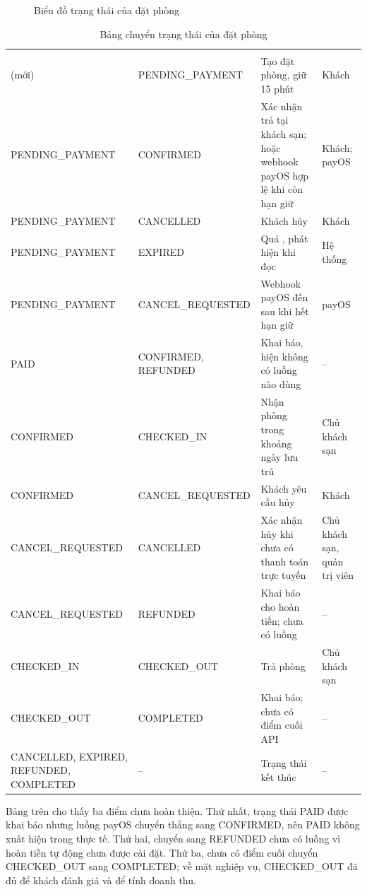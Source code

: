 \begin{figure}[H]
\centering
{}
\caption{Biểu đồ trạng thái của đặt phòng}\label{fig:state-booking}
\end{figure}

\begin{rtable}
\begin{longtable}{|L{3.4cm}|L{3.4cm}|L{4.3cm}|L{3.6cm}|}
\caption{Bảng chuyển trạng thái của đặt phòng}\label{tab:booking-states}\\
\hline
{} &  &  &  \\ \hline
\endfirsthead
\hline
{} &  &  &  \\ \hline
\endhead
(mới) & PENDING\_PAYMENT & Tạo đặt phòng, giữ 15 phút & Khách \\ \hline
PENDING\_PAYMENT & CONFIRMED & Xác nhận trả tại khách sạn; hoặc webhook payOS hợp lệ khi còn hạn giữ & Khách; payOS \\ \hline
PENDING\_PAYMENT & CANCELLED & Khách hủy & Khách \\ \hline
PENDING\_PAYMENT & EXPIRED & Quá , phát hiện khi đọc & Hệ thống \\ \hline
PENDING\_PAYMENT & CANCEL\_REQUESTED & Webhook payOS đến sau khi hết hạn giữ & payOS \\ \hline
PAID & CONFIRMED, REFUNDED & Khai báo, hiện không có luồng nào dùng & -- \\ \hline
CONFIRMED & CHECKED\_IN & Nhận phòng trong khoảng ngày lưu trú & Chủ khách sạn \\ \hline
CONFIRMED & CANCEL\_REQUESTED & Khách yêu cầu hủy & Khách \\ \hline
CANCEL\_REQUESTED & CANCELLED & Xác nhận hủy khi chưa có thanh toán trực tuyến & Chủ khách sạn, quản trị viên \\ \hline
CANCEL\_REQUESTED & REFUNDED & Khai báo cho hoàn tiền; chưa có luồng & -- \\ \hline
CHECKED\_IN & CHECKED\_OUT & Trả phòng & Chủ khách sạn \\ \hline
CHECKED\_OUT & COMPLETED & Khai báo; chưa có điểm cuối API & -- \\ \hline
CANCELLED, EXPIRED, REFUNDED, COMPLETED & -- & Trạng thái kết thúc & -- \\ \hline
\end{longtable}
\end{rtable}

Bảng trên cho thấy ba điểm chưa hoàn thiện. Thứ nhất, trạng thái PAID được khai báo nhưng luồng payOS chuyển thẳng sang CONFIRMED, nên PAID không xuất hiện trong thực tế. Thứ hai, chuyển sang REFUNDED chưa có luồng vì hoàn tiền tự động chưa được cài đặt. Thứ ba, chưa có điểm cuối chuyển CHECKED\_OUT sang COMPLETED; về mặt nghiệp vụ, CHECKED\_OUT đã đủ để khách đánh giá và để tính doanh thu.

